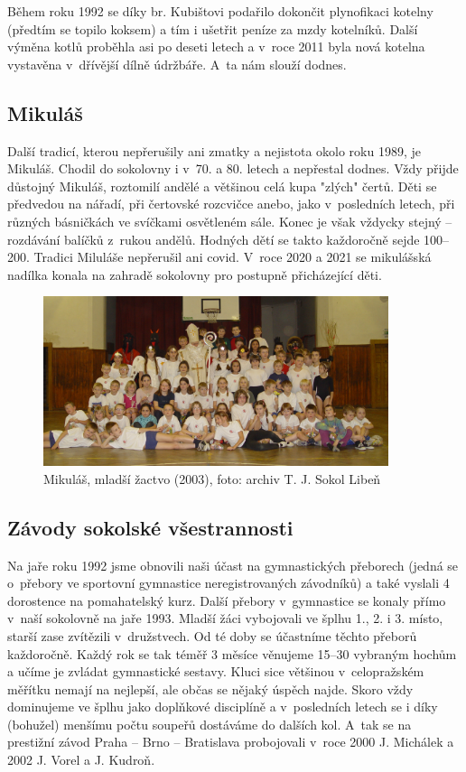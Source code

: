 \documentclass[a5paper, 11pt, twoside]{article}
\begin{document}
Během roku 1992 se díky br. Kubištovi podařilo dokončit plynofikaci
kotelny (předtím se topilo koksem) a tím i ušetřit peníze za mzdy
kotelníků. Další výměna kotlů proběhla asi po deseti letech a v~roce
2011 byla nová kotelna vystavěna v~dřívější dílně údržbáře. A~ta nám
slouží dodnes.

\subsection{Mikuláš}

Další tradicí, kterou nepřerušily ani zmatky a nejistota okolo roku
1989, je Mikuláš. Chodil do sokolovny i v~70. a 80. letech a nepřestal
dodnes. Vždy přijde důstojný Mikuláš, roztomilí andělé a většinou celá
kupa "zlých" čertů. Děti se předvedou na nářadí, při čertovské
rozcvičce anebo, jako v~posledních letech, při různých básničkách ve
svíčkami osvětleném sále. Konec je však vždycky stejný -- rozdávání
balíčků z~rukou andělů. Hodných dětí se takto každoročně sejde 100--200.
Tradici Miluláše nepřerušil ani covid. V~roce 2020 a 2021 se mikulášská
nadílka konala na zahradě sokolovny pro postupně přicházející děti.

\begin{figure}[h!]
  \centering 
  \includegraphics[width=0.9\textwidth]{img/41_mikulas.JPG}
  \caption*{Mikuláš, mladší žactvo (2003), foto: archiv T. J. Sokol Libeň}
\end{figure}

\subsection{Závody sokolské všestrannosti}

Na jaře roku 1992 jsme obnovili naši účast na gymnastických přeborech
(jedná se o~přebory ve sportovní gymnastice neregistrovaných závodníků)
a také vyslali 4 dorostence na pomahatelský kurz. Další přebory
v~gymnastice se konaly přímo v~naší sokolovně na jaře 1993. Mladší žáci
vybojovali ve šplhu 1., 2. i 3. místo, starší zase zvítězili
v~družstvech. Od té doby se účastníme těchto přeborů každoročně. Každý rok
se tak téměř 3 měsíce věnujeme 15--30 vybraným hochům a učíme je zvládat
gymnastické sestavy. Kluci sice většinou v~celopražském měřítku nemají
na nejlepší, ale občas se nějaký úspěch najde. Skoro vždy dominujeme ve
šplhu jako doplňkové disciplíně a v~posledních letech se i díky
(bohužel) menšímu počtu soupeřů dostáváme do dalších kol. A~tak se na
prestižní závod Praha -- Brno -- Bratislava probojovali v~roce 2000 J.
Michálek a 2002 J. Vorel a J. Kudroň.
\end{document}
